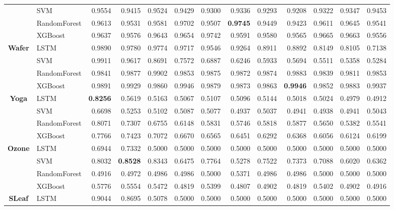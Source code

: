 \begin{table}[h]
\begin{adjustbox}{max width=15cm}
\begin{tabular}{|c|l|r|r|r|r|r|r|r|r|r|r|r|}
	& SVM &  0.9554 &  0.9415 &  0.9524 &  0.9429 &  0.9300 &  0.9336 &  0.9293 &  0.9208 &  0.9322 &  0.9347 &  0.9453 \\
	& RandomForest &  0.9613 &  0.9531 &  0.9581 &  0.9702 &  0.9507 &  \textbf{0.9745} &  0.9449 &  0.9423 &  0.9611 &  0.9645 &  0.9541 \\
	& XGBoost &  0.9637 &  0.9576 &  0.9643 &  0.9654 &  0.9742 &  0.9591 &  0.9580 &  0.9565 &  0.9665 &  0.9663 &  0.9556 \\
	\hline
	\textbf{Wafer} & LSTM &  0.9890 &  0.9780 &  0.9774 &  0.9717 &  0.9546 &  0.9264 &  0.8911 &  0.8892 &  0.8149 &  0.8105 &  0.7138 \\
	& SVM &  0.9911 &  0.9617 &  0.8691 &  0.7572 &  0.6887 &  0.6246 &  0.5933 &  0.5694 &  0.5511 &  0.5358 &  0.5284 \\
	& RandomForest &  0.9841 &  0.9877 &  0.9902 &  0.9853 &  0.9875 &  0.9872 &  0.9874 &  0.9883 &  0.9839 &  0.9811 &  0.9853 \\
	& XGBoost &  0.9891 &  0.9929 &  0.9860 &  0.9946 &  0.9879 &  0.9873 &  0.9863 &  \textbf{0.9946} &  0.9852 &  0.9883 &  0.9937 \\
	\hline
	\textbf{Yoga} & LSTM &  \textbf{0.8256} &  0.5619 &  0.5163 &  0.5067 &  0.5107 &  0.5096 &  0.5144 &  0.5018 &  0.5024 &  0.4979 &  0.4912 \\
	& SVM &  0.6698 &  0.5253 &  0.5102 &  0.5087 &  0.5077 &  0.4937 &  0.5037 &  0.4941 &  0.4938 &  0.4941 &  0.5043 \\
	& RandomForest &  0.8071 &  0.7307 &  0.6755 &  0.6148 &  0.5831 &  0.5746 &  0.5818 &  0.5877 &  0.5650 &  0.5382 &  0.5541 \\
	& XGBoost &  0.7766 &  0.7423 &  0.7072 &  0.6670 &  0.6565 &  0.6451 &  0.6292 &  0.6368 &  0.6056 &  0.6124 &  0.6199 \\
	\hline
	\textbf{Ozone} & LSTM &  0.6944 &  0.7332 &  0.5000 &  0.5000 &  0.5000 &  0.5000 &  0.5000 &  0.5000 &  0.5000 &  0.5000 &  0.5000 \\
	& SVM &  0.8032 &  \textbf{0.8528} &  0.8343 &  0.6475 &  0.7764 &  0.5278 &  0.7522 &  0.7373 &  0.7088 &  0.6020 &  0.6362 \\
	& RandomForest &  0.4916 &  0.4972 &  0.4986 &  0.4986 &  0.5000 &  0.5371 &  0.4986 &  0.4986 &  0.5000 &  0.5000 &  0.5000 \\
	& XGBoost &  0.5776 &  0.5554 &  0.5472 &  0.4819 &  0.5399 &  0.4807 &  0.4902 &  0.4819 &  0.5402 &  0.4902 &  0.4916 \\
	\hline
	\textbf{SLeaf} & LSTM &  0.9044 &  0.8695 &  0.5078 &  0.5000 &  0.5000 &  0.5000 &  0.5000 &  0.5000 &  0.5000 &  0.5000 &  0.5000 \\

\end{tabular}
\end{adjustbox}
\end{table}
